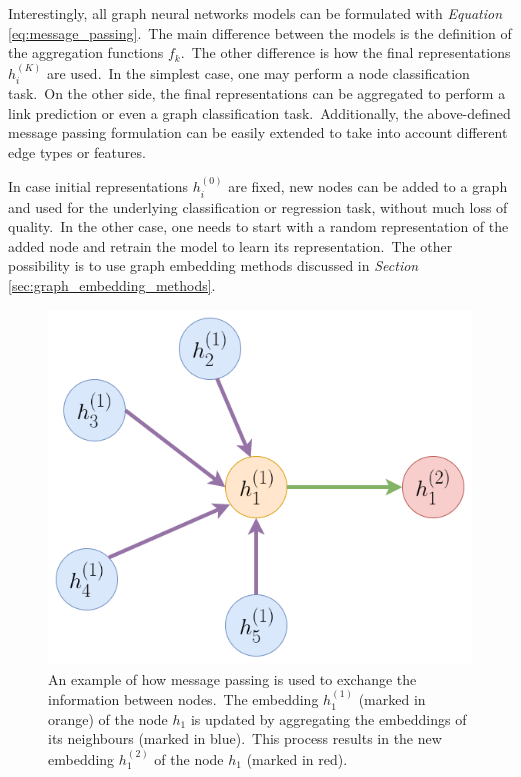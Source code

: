 \documentclass[longabstract, english, mgr]{iithesis}
\theoremstyle{default_theorem_style}\newtheorem{theorem}{Theorem}
\theoremstyle{default_theorem_style}\newtheorem{definition}{Definition}
\begin{document}
\noindent Interestingly, all graph neural networks models can be formulated with
\textit{Equation} \ref{eq:message_passing}.\ The main difference between the models is the definition of the
aggregation functions $f_k$.\ The other difference is how the final representations $h_i^{(K)}$ are used.\ In the
simplest case, one may perform a node classification task.\ On the other side, the final representations can be
aggregated to perform a link prediction or even a graph classification task.\ Additionally, the above-defined
message passing formulation can be easily extended to take into account different edge types or features.\newline

\noindent In case initial representations $h_i^{(0)}$ are fixed, new nodes can be added to a graph and
used for the underlying classification or regression task, without much loss of quality.\ In the other case, one needs
to start with a random representation of the added node and retrain the model to learn its representation.\ The other
possibility is to use graph embedding methods discussed in \textit{Section} \ref{sec:graph_embedding_methods}.

\begin{figure}[t]
\centering
\includegraphics[scale=0.4]{graph_network}
\caption{An example of how message passing is used to exchange the information between nodes.\ The embedding
$h_1^{(1)}$ (marked in orange) of the node $h_1$ is updated by aggregating the embeddings of its
neighbours (marked in blue).\ This process results in the new embedding $h_1^{(2)}$ of the node $h_1$ (marked in red).}
\label{fig:graph_network}
\end{figure}
\end{document}
